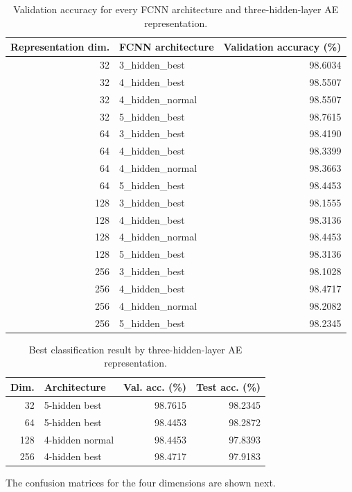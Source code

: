 \documentclass[conference,onecolumn]{IEEEtran}
\begin{document}
\begin{table}[H]
\centering
\small
\caption{Validation accuracy for every FCNN architecture and three-hidden-layer AE representation.}
\label{tab:task4-all-val}
\begin{tabular}{r l r}
\toprule
Representation dim. & FCNN architecture & Validation accuracy (\%)\\
\midrule
32 & 3\_hidden\_best & 98.6034 \\
32 & 4\_hidden\_best & 98.5507 \\
32 & 4\_hidden\_normal & 98.5507 \\
32 & 5\_hidden\_best & 98.7615 \\
64 & 3\_hidden\_best & 98.4190 \\
64 & 4\_hidden\_best & 98.3399 \\
64 & 4\_hidden\_normal & 98.3663 \\
64 & 5\_hidden\_best & 98.4453 \\
128 & 3\_hidden\_best & 98.1555 \\
128 & 4\_hidden\_best & 98.3136 \\
128 & 4\_hidden\_normal & 98.4453 \\
128 & 5\_hidden\_best & 98.3136 \\
256 & 3\_hidden\_best & 98.1028 \\
256 & 4\_hidden\_best & 98.4717 \\
256 & 4\_hidden\_normal & 98.2082 \\
256 & 5\_hidden\_best & 98.2345 \\
\bottomrule
\end{tabular}
\end{table}

\begin{table}[H]
\centering
\small
\caption{Best classification result by three-hidden-layer AE representation.}
\label{tab:task4-results}
\begin{tabular}{r l r r}
\toprule
Dim. & Architecture & Val. acc. (\%) & Test acc. (\%)\\
\midrule
32 & 5-hidden best & 98.7615 & 98.2345\\
64 & 5-hidden best & 98.4453 & 98.2872\\
128 & 4-hidden normal & 98.4453 & 97.8393\\
256 & 4-hidden best & 98.4717 & 97.9183\\
\bottomrule
\end{tabular}
\end{table}

The confusion matrices for the four dimensions are shown next.
\end{document}
